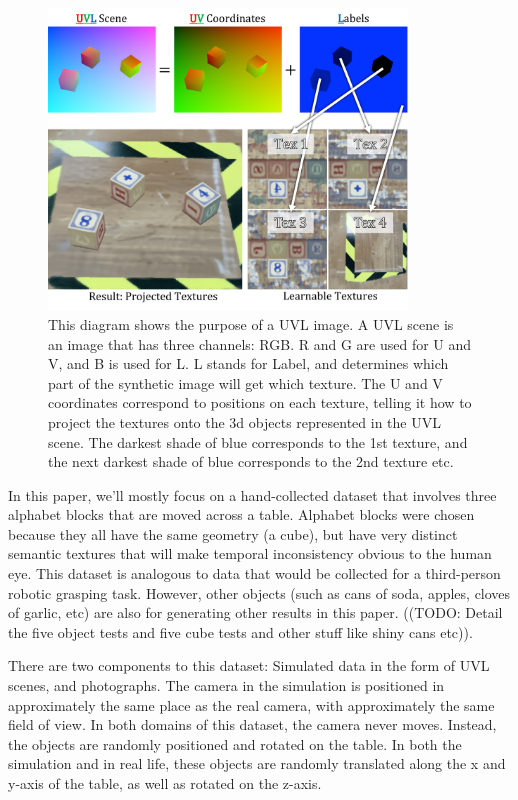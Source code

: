 \documentclass{article}
\begin{document}
\begin{figure}[H]
	\begin{center}
		\includegraphics[width=270pt]{../images/uvl_explanation.pdf}
	\end{center}
	\caption{
		This diagram shows the purpose of a UVL image.
		A UVL scene is an image that has three channels: RGB.
		R and G are used for U and V, and B is used for L.
		L stands for Label, and determines which part of the synthetic image will get which texture.
		The U and V coordinates correspond to positions on each texture,
		telling it how to project the textures onto the 3d objects represented in the UVL scene.
		The darkest shade of blue corresponds to the 1st texture, and the next darkest shade of blue corresponds to the 2nd texture etc.
		}
	\label{fig:uvl_explanation}
\end{figure}

In this paper, we'll mostly focus on a hand-collected dataset that involves three alphabet blocks that are moved across a table.
Alphabet blocks were chosen because they all have the same geometry (a cube), but have very distinct semantic textures that will make temporal inconsistency obvious to the human eye.
This dataset is analogous to data that would be collected for a third-person robotic grasping task.
However, other objects (such as cans of soda, apples, cloves of garlic, etc) are also for generating other results in this paper. ((TODO: Detail the five object tests and five cube tests and other stuff like shiny cans etc)).

There are two components to this dataset: Simulated data in the form of UVL scenes, and photographs.
The camera in the simulation is positioned in approximately the same place as the real camera, with approximately the same field of view.
In both domains of this dataset, the camera never moves. Instead, the objects are randomly positioned and rotated on the table.
In both the simulation and in real life, these objects are randomly translated along the x and y-axis of the table, as well as rotated on the z-axis.
\end{document}
